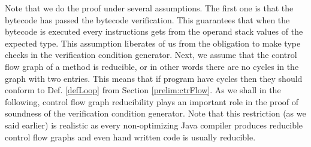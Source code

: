  

Note that we do the proof under several assumptions. The first one is that the bytecode has passed the bytecode verification.
This guarantees that when the bytecode  is executed every instructions gets from the operand stack values
of the expected type. This assumption liberates of us from the obligation to make type checks in the verification condition generator.
Next, we assume that the control flow graph of a method is reducible, or in other words there 
are no cycles in the graph with two entries. This means that if program have cycles then they should 
conform to Def. \ref{defLoop} from Section \ref{prelim:ctrFlow}.
As we shall in the following, control flow graph reducibility plays an important role in
 the proof of soundness of the verification condition generator. 
Note that this restriction (as we said earlier) is realistic as every non-optimizing Java compiler produces
reducible control flow graphs and even hand written code is usually reducible.

